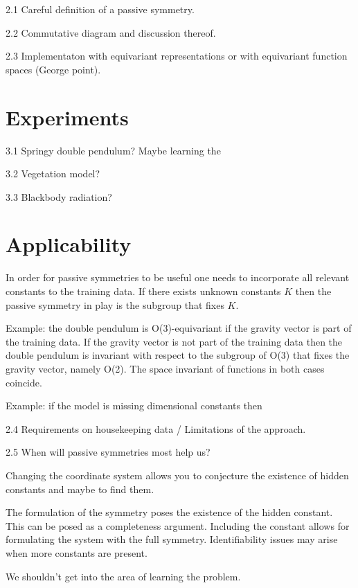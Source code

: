 \documentclass{article}
\theoremstyle{plain}
\theoremstyle{definition}
\theoremstyle{remark}
\begin{document}
   2.1 Careful definition of a passive symmetry.
   
   2.2 Commutative diagram and discussion thereof.
   
   2.3 Implementaton with equivariant representations or with equivariant function spaces (George point).


\section{Experiments}\label{sec:experiments}

   3.1 Springy double pendulum? Maybe learning the 
   
   3.2 Vegetation model?
   
   3.3 Blackbody radiation?

\section{Applicability}\label{sec:applicability}

In order for passive symmetries to be useful one needs to incorporate all relevant constants to the training data. If there exists unknown constants $K$ then the passive symmetry in play is the subgroup that fixes $K$.

Example: the double pendulum is O(3)-equivariant if the gravity vector is part of the training data. If the gravity vector is not part of the training data then the double pendulum is invariant with respect to the subgroup of O(3) that fixes the gravity vector, namely O(2). The space invariant of functions in both cases coincide.

Example: if the model is missing dimensional constants then 

   2.4 Requirements on housekeeping data / Limitations of the approach.

   2.5 When will passive symmetries most help us?
   
   Changing the coordinate system allows you to conjecture the existence of hidden constants and maybe to find them. 
   
   The formulation of the symmetry poses the existence of the hidden constant. This can be posed as a completeness argument. Including the constant allows for formulating the system with the full symmetry.
   Identifiability issues may arise when more constants are present.
   
   We shouldn't get into the area of learning the problem. 
\end{document}
